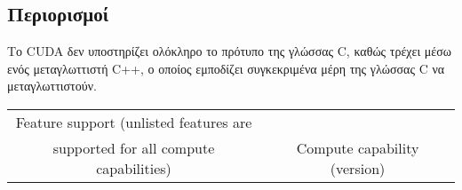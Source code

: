 \subsection{Περιορισμοί}
 Το CUDA δεν υποστηρίζει ολόκληρο το πρότυπο της γλώσσας C, καθώς τρέχει μέσω ενός μεταγλωττιστή C++, ο οποίος εμποδίζει συγκεκριμένα μέρη της γλώσσας C να μεταγλωττιστούν.
\begin{table}
\begin{tabular}{ | c | c |}
Feature support (unlisted features are\\ supported for all compute capabilities) & Compute capability (version)\\ \hline
\end{tabular}
\end{table}